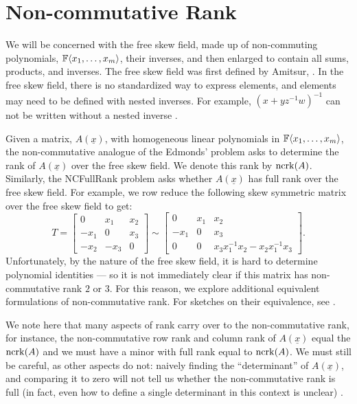 \section{Non-commutative Rank}\label{ncrkdefs}
We will be concerned with the free skew field, made up of non-commuting polynomials, ${\mathbb F}\langle x_1,\ldots,x_m\rangle$, their inverses, and then enlarged to contain all sums, products, and inverses. The free skew field was first defined by Amitsur, \cite{Amit66}. In the free skew field, there is no standardized way to express elements, and elements may need to be defined with nested inverses. For example, $(x+yz^{-1}w)^{-1}$ can not be written without a nested inverse \cite{HW14}. 

Given a matrix, $A(\underline{x})$, with homogeneous linear polynomials in ${\mathbb F}\langle x_1,\ldots,x_m\rangle$, the non-commutative analogue of the Edmonds' problem asks to determine the rank of $A(\underline{x})$ over the free skew field. We denote this rank by $\operatorname{ncrk}(A)$. Similarly, the NCFullRank problem asks whether $A(\underline{x})$ has full rank over the free skew field. 
For example, we row reduce the following skew symmetric matrix over the free skew field to get:
\begin{equation}\label{OurExample}
T=\begin{bmatrix}
0 & x_1 & x_2\\ 
-x_1 & 0 &x_3 \\ 
-x_2 & -x_3  & 0
\end{bmatrix} \sim \begin{bmatrix}
0 & x_1 & x_2\\ 
-x_1 & 0 &x_3 \\ 
0 & 0  & x_3x_1^{-1}x_2-x_2x_1^{-1}x_3
\end{bmatrix}.
\end{equation}
Unfortunately, by the nature of the free skew field, it is hard to determine polynomial identities --- so it is not immediately clear if this matrix has non-commutative rank $2$ or $3$. For this reason, we explore additional equivalent formulations of non-commutative rank. For sketches on their equivalence, see \cite{IQS17}. 

We note here that many aspects of rank carry over to the non-commutative rank, for instance, the non-commutative row rank and column rank of $A(\underline{x})$ equal the $\operatorname{ncrk}(A)$ and we must have a minor with full rank equal to $\operatorname{ncrk}(A)$. We must still be careful, as other aspects do not: naively finding the ``determinant'' of $A(\underline{x})$, and comparing it to zero will not tell us whether the non-commutative rank is full (in fact, even how to define a single determinant in this context is unclear) \cite{GR91}.


